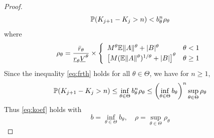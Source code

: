\begin{proof}
\begin{equation}
    \label{eq:frth}
    \P (K_{j+1} - K_j > n) < b_{\theta}^n \rho_{\theta}
  \end{equation}
  where
  \[
  \rho_{\theta} = {
    \bar r_{\theta}
    \over
    \underline r_{\theta} \underline V^\theta
  } \times \left\{
  \begin{array}{ll}
    M^\theta \E \|A\|^\theta + |B|^\theta
    &
    \theta < 1
    \\
    \left[
      M (\E \|A\|^\theta)^{1/\theta} + |B|      
    \right]^\theta
    &
    \theta \geq 1
  \end{array}
  \right.
  \]
  Since the inequality \eqref{eq:frth} holds for all
  $\theta \in \Theta$, we have for $n \geq 1$,
  \[
  \P (K_{j+1} - K_j> n)
  \leq
  \inf_{\theta \in \Theta}
  b_\theta^n \rho_\theta
  \leq
  \left(
    \inf_{\theta \in \Theta}
    b_{\theta}
    \right)^n
  \sup_{\theta \in \Theta} \rho_{\theta}
  \]
  Thus \eqref{eq:koef} holds with
  \begin{equation}
    \label{eq:b_def}
    b = \inf_{\theta \in \Theta} b_{\theta},
    \quad
    \rho = \sup_{\theta \in \Theta} \rho_{\theta}
  \end{equation}
\end{proof}

